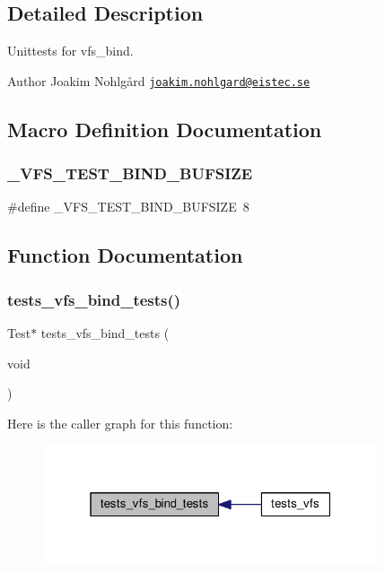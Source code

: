 \subsection{Detailed Description}
Unittests for vfs\+\_\+bind. 

\begin{DoxyAuthor}{Author}
Joakim Nohlgård \href{mailto:joakim.nohlgard@eistec.se}{\tt joakim.\+nohlgard@eistec.\+se} 
\end{DoxyAuthor}


\subsection{Macro Definition Documentation}
\mbox{\label{tests-vfs-bind_8c_a35bd6d79e47ef40d437218e91e714a67}} 
\subsubsection{\texorpdfstring{\+\_\+\+V\+F\+S\+\_\+\+T\+E\+S\+T\+\_\+\+B\+I\+N\+D\+\_\+\+B\+U\+F\+S\+I\+ZE}{\_VFS\_TEST\_BIND\_BUFSIZE}}
{\footnotesize\ttfamily \#define \+\_\+\+V\+F\+S\+\_\+\+T\+E\+S\+T\+\_\+\+B\+I\+N\+D\+\_\+\+B\+U\+F\+S\+I\+ZE~8}



\subsection{Function Documentation}
\mbox{\label{tests-vfs-bind_8c_a93aa0948d1133fbb161d95ab38a0a19f}} 
\subsubsection{\texorpdfstring{tests\+\_\+vfs\+\_\+bind\+\_\+tests()}{tests\_vfs\_bind\_tests()}}
{\footnotesize\ttfamily Test$\ast$ tests\+\_\+vfs\+\_\+bind\+\_\+tests (\begin{DoxyParamCaption}\item[{void}]{ }\end{DoxyParamCaption})}

Here is the caller graph for this function\+:
\nopagebreak
\begin{figure}[H]
\begin{center}
\leavevmode
\includegraphics[width=280pt]{tests-vfs-bind_8c_a93aa0948d1133fbb161d95ab38a0a19f_icgraph}
\end{center}
\end{figure}
